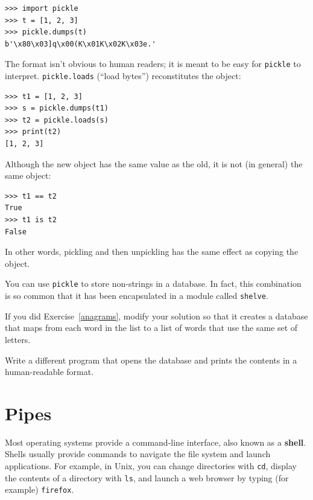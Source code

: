 \documentclass[10pt]{book}
\begin{document}
\beforeverb
\begin{verbatim}
>>> import pickle
>>> t = [1, 2, 3]
>>> pickle.dumps(t)
b'\x80\x03]q\x00(K\x01K\x02K\x03e.'
\end{verbatim}
\afterverb
%
The format isn't obvious to human readers; it is meant to be
easy for {\tt pickle} to interpret.  {\tt pickle.loads}
(``load bytes'') reconstitutes the object:

\beforeverb
\begin{verbatim}
>>> t1 = [1, 2, 3]
>>> s = pickle.dumps(t1)
>>> t2 = pickle.loads(s)
>>> print(t2)
[1, 2, 3]
\end{verbatim}
\afterverb
%
Although the new object has the same value as the old, it is
not (in general) the same object:

\beforeverb
\begin{verbatim}
>>> t1 == t2
True
>>> t1 is t2
False
\end{verbatim}
\afterverb
%
In other words, pickling and then unpickling has the same effect
as copying the object.

You can use {\tt pickle} to store non-strings in a database.
In fact, this combination is so common that it has been
encapsulated in a module called {\tt shelve}.  



\begin{ex}


If you did Exercise~\ref{anagrams}, modify your solution so that
it creates a database that maps from each word in the list to
a list of words that use the same set of letters.

Write a different program that opens the database and prints
the contents in a human-readable format.
\end{ex}


\section{Pipes}


Most operating systems provide a command-line interface,
also known as a {\bf shell}.  Shells usually provide commands
to navigate the file system and launch applications.  For
example, in Unix, you can change directories with {\tt cd},
display the contents of a directory with {\tt ls}, and launch
a web browser by typing (for example) {\tt firefox}.
\end{document}
